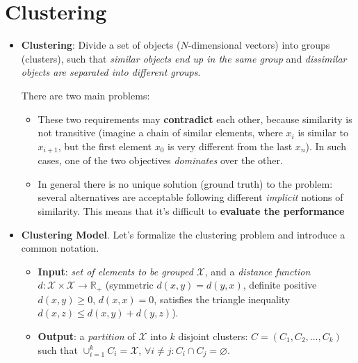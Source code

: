 \documentclass[../template.tex]{subfiles}
\begin{document}
\section{Clustering}
\begin{itemize}
    \item \textbf{Clustering}: Divide a set of objects ($N$-dimensional vectors) into groups (clusters), such that \textit{similar objects end up in the same group} and \textit{dissimilar objects are separated into different groups}. 
    
    There are two main problems:
    \begin{itemize}
        \item These two requirements may \textbf{contradict} each other, because similarity is not transitive (imagine a chain of similar elements, where $x_i$ is similar to $x_{i+1}$, but the first element $x_0$ is very different from the last $x_n$). In such cases, one of the two objectives \textit{dominates} over the other. 
        \item In general there is no unique solution (ground truth) to the problem: several alternatives are acceptable following different \textit{implicit} notions of similarity. This means that it's difficult to \textbf{evaluate\textbf{ the performance}}
    \end{itemize}
    
    \item \textbf{Clustering Model}. Let's formalize the clustering problem and introduce a common notation.
    \begin{itemize}
        \item \textbf{Input}: \textit{set of elements to be grouped} $\mathcal{X}$, and a \textit{distance function} $d\colon \mathcal{X}\times \mathcal{X} \to \mathbb{R}_+$ (symmetric $d(x,y)=d(y,x)$, definite positive $d(x,y)\geq 0$, $d(x,x) = 0$, satisfies the triangle inequality $d(x,z) \leq d(x,y) + d(y,z)$).
        \item \textbf{Output}: a \textit{partition} of $\mathcal{X}$ into $k$ disjoint clusters: $C = (C_1, C_2, \dots, C_k)$ such that $\cup_{i=1}^k C_i = \mathcal{X}$, $\forall i \neq j\colon C_i \cap C_j = \varnothing$.
    \end{itemize}


\end{itemize}
\end{document}
